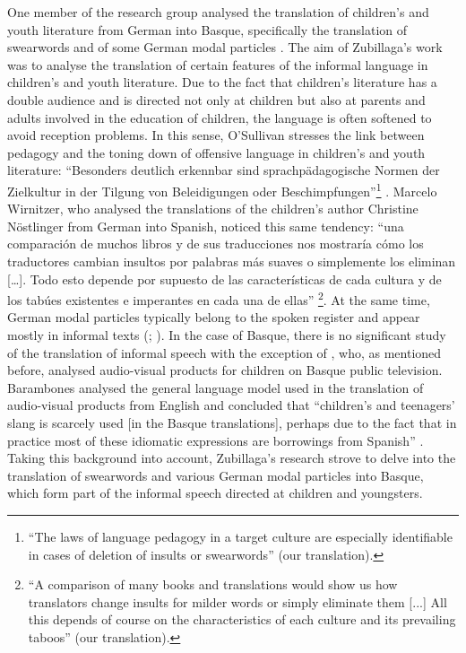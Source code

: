 \documentclass[output=paper]{LSP/langsci}
\begin{document}
One member of the research group analysed the translation of children’s and youth literature from German into Basque, specifically the translation of swearwords and of some German modal particles \citep{Zubillaga2013}. The aim of Zubillaga’s work was to analyse the translation of certain features of the informal language in children’s and youth literature. Due to the fact that children’s literature has a double audience and is directed not only at children but also at parents and adults involved in the education of children, the language is often softened to avoid reception problems. In this sense, O’Sullivan stresses the link between pedagogy and the toning down of offensive language in children’s and youth literature: “Besonders deutlich erkennbar sind sprachpädagogische Normen der Zielkultur in der Tilgung von Beleidigungen oder Beschimpfungen”\footnote{“The laws of language pedagogy in a target culture are especially identifiable in cases of deletion of insults or swearwords” (our translation).}  \citep[212]{OSullivan2000}. Marcelo Wirnitzer, who analysed the translations of the children’s author Christine Nöstlinger from German into Spanish, noticed this same tendency: “una comparación de muchos libros y de sus traducciones nos mostraría cómo los traductores cambian insultos por palabras más suaves o simplemente los eliminan […]. Todo esto depende por supuesto de las características de cada cultura y de los tabúes existentes e imperantes en cada una de ellas” \citep[146]{Marcelo2007}\footnote{“A comparison of many books and translations would show us how translators change insults for milder words or simply eliminate them [...] All this depends of course on the characteristics of each culture and its prevailing taboos” (our translation).}. At the same time, German modal particles typically belong to the spoken register and appear mostly in informal texts (\citealt[12]{Helbig1988}; \citealt[16]{Pruefer1995}). In the case of Basque, there is no significant study of the translation of informal speech with the exception of \citet{Barambones2012}, who, as mentioned before, analysed audio-visual products for children on Basque public television. Barambones analysed the general language model used in the translation of audio-visual products from English and concluded that “children’s and teenagers’ slang is scarcely used [in the Basque translations], perhaps due to the fact that in practice most of these idiomatic expressions are borrowings from Spanish” \citep[166-167]{Barambones2012}. Taking this background into account, Zubillaga's research strove to delve into the translation of swearwords and various German modal particles into Basque, which form part of the informal speech directed at children and youngsters.
\end{document}
